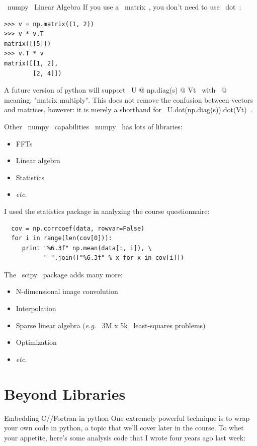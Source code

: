 \documentclass[10pt, t]{beamer}
\let\verb=\codeDelimTwiddles
\begin{document}
\begin{frame}[fragile,label=sec-3-35]{\verb~numpy~ Linear Algebra}
 If you use a \verb~matrix~, you don't need to use \verb~dot~:
\lstset{language=Python,label= ,caption= ,numbers=none}
\begin{lstlisting}
>>> v = np.matrix((1, 2))
>>> v * v.T
matrix([[5]])
>>> v.T * v
matrix([[1, 2],
        [2, 4]])
\end{lstlisting}

\pause
A future version of python will support \verb~U @ np.diag(s) @ Vt~
with \verb~@~ meaning, "matrix multiply".
\pause
This does not remove the confusion between vectors and matrices, however: it is
merely a shorthand for \verb~U.dot(np.diag(s)).dot(Vt)~.
\end{frame}

\begin{frame}[fragile,label=sec-3-36]{Other \verb~numpy~ capabilities}
 \verb~numpy~ has lots of libraries:
\begin{itemize}
\item FFTs
\item Linear algebra
\item Statistics
\item \emph{etc.}
\end{itemize}

\pause
I used the statistics package in analyzing the course questionnaire:
\lstset{language=Python,label= ,caption= ,numbers=none}
\begin{lstlisting}
  cov = np.corrcoef(data, rowvar=False)
  for i in range(len(cov[0])):
     print "%6.3f" np.mean(data[:, i]), \
           " ".join(["%6.3f" % x for x in cov[i]])
\end{lstlisting}

\pause
The \verb~scipy~ package adds many more:
\begin{itemize}
\item N-dimensional image convolution
\item Interpolation
\item Sparse linear algebra (\emph{e.g.} \verb~3M x 5k~ least-squares problems)
\item Optimization
\item \emph{etc.}
\end{itemize}
\end{frame}

\section{Beyond Libraries}
\label{sec-4}
\begin{frame}[label=sec-4-1]{Embedding C/\CPP/Fortran in python}
One extremely powerful technique is to wrap your own code in python, a topic that we'll cover 
later in the course.  To whet your appetite, here's some analysis code that I wrote four years ago last week:
\end{frame}
\end{document}
